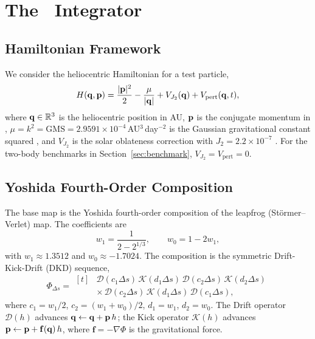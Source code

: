 
\section{The \AAS\ Integrator}
\label{sec:method}

\subsection{Hamiltonian Framework}
\label{sec:hamiltonian}

We consider the heliocentric Hamiltonian for a test particle,
\begin{equation}
  H(\mathbf{q}, \mathbf{p}) = \frac{|\mathbf{p}|^2}{2}
    - \frac{\mu}{|\mathbf{q}|}
    + V_{J_2}(\mathbf{q})
    + V_{\mathrm{pert}}(\mathbf{q}, t),
  \label{eq:hamiltonian}
\end{equation}
where $\mathbf{q} \in \mathbb{R}^3$ is the heliocentric position in AU,
$\mathbf{p}$ is the conjugate momentum in \unitAUd,
$\mu = k^2 = \mathrm{GMS} = 2.9591\times10^{-4}$\,AU$^3$\,day$^{-2}$
is the Gaussian gravitational constant squared \citep{constants_iau2015},
and $V_{J_2}$ is the solar oblateness correction with
$J_2 = 2.2\times10^{-7}$ \citep{constants_iau2015}.
For the two-body benchmarks in Section~\ref{sec:benchmark},
$V_{J_2} = V_{\mathrm{pert}} = 0$.

\subsection{Yoshida Fourth-Order Composition}
\label{sec:yoshida}

The base map is the Yoshida fourth-order composition
\citep{Yoshida1990} of the leapfrog (Störmer--Verlet) map.
The coefficients are
\begin{equation}
  w_1 = \frac{1}{2 - 2^{1/3}}, \qquad
  w_0 = 1 - 2w_1,
  \label{eq:yoshida_coeffs}
\end{equation}
with $w_1 \approx 1.3512$ and $w_0 \approx -1.7024$.
The composition is the symmetric Drift-Kick-Drift (DKD) sequence,
\begin{equation}
  \Phi_{\Delta s} =
    \begin{aligned}[t]
      &\mathcal{D}(c_1\Delta s)\,
      \mathcal{K}(d_1\Delta s)\,
      \mathcal{D}(c_2\Delta s)\,
      \mathcal{K}(d_2\Delta s)\\
      &\times\,\mathcal{D}(c_2\Delta s)\,
      \mathcal{K}(d_1\Delta s)\,
      \mathcal{D}(c_1\Delta s),
    \end{aligned}
  \label{eq:dkd}
\end{equation}
where $c_1 = w_1/2$, $c_2 = (w_1+w_0)/2$, $d_1 = w_1$,
$d_2 = w_0$. The Drift operator $\mathcal{D}(h)$ advances
$\mathbf{q} \leftarrow \mathbf{q} + \mathbf{p}\,h$; the Kick operator $\mathcal{K}(h)$
advances $\mathbf{p} \leftarrow \mathbf{p} + \mathbf{f}(\mathbf{q})\,h$, where
$\mathbf{f} = -\nabla\Phi$ is the gravitational force.

